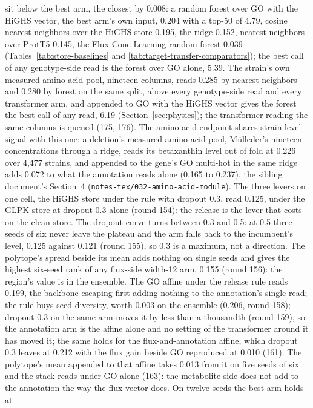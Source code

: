 sit below the best arm, the closest by 0.008: a random forest over GO with the HiGHS
vector, the best arm's own input, 0.204 with a top-50 of 4.79, cosine nearest neighbors
over the HiGHS store 0.195, the ridge 0.152, nearest neighbors over ProtT5 0.145, the
Flux Cone Learning random forest 0.039 (Tables~\ref{tab:store-baselines} and
\ref{tab:target-transfer-comparators}); the best call of any genotype-side read is the
forest over GO alone, 5.39. The strain's own measured amino-acid pool, nineteen
columns, reads 0.285 by nearest neighbors and 0.280 by forest on the same split, above
every genotype-side read and every transformer arm, and appended to GO with the HiGHS
vector gives the forest the best call of any read, 6.19 (Section~\ref{sec:physics});
the transformer reading the same columns is queued (175, 176). The
amino-acid endpoint shares strain-level signal with this one: a deletion's measured
amino-acid pool, M\"ulleder's nineteen concentrations through a ridge, reads its
betaxanthin level out of fold at 0.226 over 4,477 strains, and appended to the gene's
GO multi-hot in the same ridge adds 0.072 to what the annotation reads alone (0.165 to
0.237), the sibling document's Section~4 (\texttt{notes-tex/032-amino-acid-module}). The three levers on one cell,
the HiGHS store under the rule with dropout 0.3, read 0.125, under the GLPK store at
dropout 0.3 alone (round 154): the release is the lever that costs on the clean store.
The dropout curve turns between 0.3 and 0.5: at 0.5 three seeds of six never leave
the plateau and the arm falls back to the incumbent's level, 0.125 against 0.121
(round 155), so 0.3 is a maximum, not a direction. The polytope's spread beside its
mean adds nothing on single seeds and gives the highest six-seed rank of any flux-side
width-12 arm, 0.155 (round 156): the region's value is in the ensemble. The GO affine
under the release rule reads 0.199, the backbone escaping first adding nothing to the
annotation's single read; the rule buys seed diversity, worth 0.003 on the ensemble
(0.206, round 158); dropout 0.3 on the same arm moves it by less than a thousandth
(round 159), so the annotation arm is the affine alone and no setting of the
transformer around it has moved it; the same holds for the flux-and-annotation affine,
which dropout 0.3 leaves at 0.212 with the flux gain beside GO reproduced at 0.010
(161). The polytope's mean appended to that affine takes 0.013 from it on five seeds
of six and the stack reads under GO alone (163): the metabolite side does not add to
the annotation the way the flux vector does. On twelve seeds the best arm holds at
